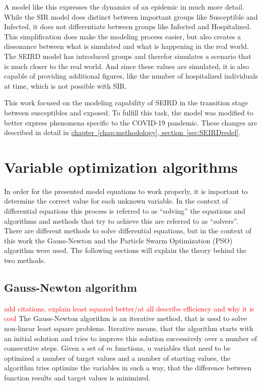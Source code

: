 A model like this expresses the dynamics of an epidemic in much more detail. While the SIR model does distinct between important
groups like Susceptible and Infected, it does not differentiate between groups like Infected and Hospitalized. This simplification
does make the modeling process easier, but also creates a dissonance between what is simulated and what is happening in the real world.
The SEIRD model has introduced groups and therefor simulates a scenario that is much closer to the real world. And since these values
are simulated, it is also capable of providing additional figures, like the number of hospitalized individuals at time, which is not
possible with SIR.\newline

This work focused on the modeling capability of SEIRD in the transition stage between susceptibles and exposed. To fulfill this
task, the model was modified to better express phenomena specific to the COVID-19 pandemic. These changes are described in detail
in \hyperref[sec:SEIRDredef]{chapter~\ref*{chap:methodology}, section~\ref*{sec:SEIRDredef}}.


\section{Variable optimization algorithms}
In order for the presented model equations to work properly, it is important to determine the correct value for each unknown variable.
In the context of differential equations this process is referred to as ``solving'' the equations and algorithms and methods that try
to achieve this are referred to as ``solvers''. There are different methods to solve differential equations, but in the context of
this work the Gauss-Newton and the Particle Swarm Optimization (PSO) algorithm were used. The following sections will explain the theory
behind the two methods.


\subsection{Gauss-Newton algorithm}
\textcolor{red}{add citations, explain least squared better/at all}
\textcolor{red}{describe efficiency and why it is cool}
\label{sec:Gauss}
The Gauss-Newton algorithm is an iterative method, that is used to solve non-linear least square problems. Iterative means, that the algorithm 
starts with an initial solution and tries to improve this solution successively over a number of consecutive steps.
Given a set of $m$ functions, $n$ variables that need to be optimized a number of target values and a number of starting values, the algorithm tries
optimize the variables in such a way, that the difference between function results and target values is minimized.\newline

